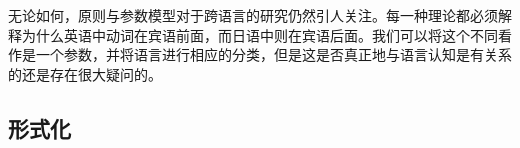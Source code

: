 无论如何，原则与参数模型对于跨语言的研究仍然引人关注。每一种理论都必须解释为什么英语中动词在宾语前面，而日语中则在宾语后面。我们可以将这个不同看作是一个参数，并将语言进行相应的分类，但是这是否真正地与语言认知是有关系的还是存在很大疑问的。

\subsection{形式化}
\label{sec-formalization-gb}

